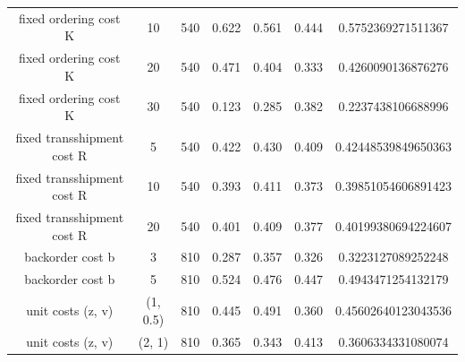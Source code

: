 \begin{table}[H]
\begin{tabular}{ccccccc}
fixed ordering cost K & 10 & 540 & 0.622 & 0.561 & 0.444 & 0.5752369271511367 \\
fixed ordering cost K & 20 & 540 & 0.471 & 0.404 & 0.333 & 0.4260090136876276 \\
fixed ordering cost K & 30 & 540 & 0.123 & 0.285 & 0.382 & 0.2237438106688996 \\
fixed transshipment cost R & 5 & 540 & 0.422 & 0.430 & 0.409 & 0.42448539849650363 \\
fixed transshipment cost R & 10 & 540 & 0.393 & 0.411 & 0.373 & 0.39851054606891423 \\
fixed transshipment cost R & 20 & 540 & 0.401 & 0.409 & 0.377 & 0.40199380694224607 \\
backorder cost b & 3 & 810 & 0.287 & 0.357 & 0.326 & 0.3223127089252248 \\
backorder cost b & 5 & 810 & 0.524 & 0.476 & 0.447 & 0.4943471254132179 \\
unit costs (z, v) & (1, 0.5) & 810 & 0.445 & 0.491 & 0.360 & 0.45602640123043536 \\
unit costs (z, v) & (2, 1) & 810 & 0.365 & 0.343 & 0.413 & 0.3606334331080074 \\
\bottomrule
\end{tabular}
\end{table}